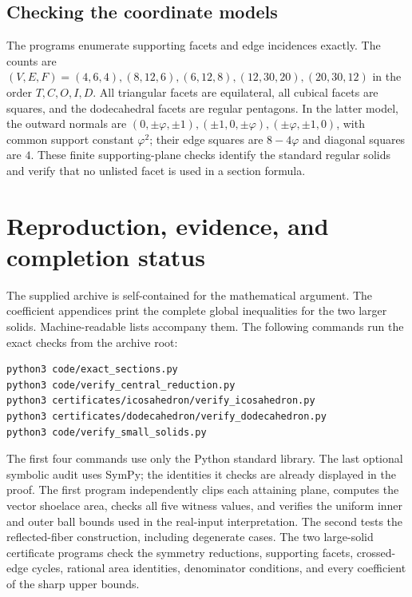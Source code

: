 \documentclass[11pt,letterpaper]{article}
\theoremstyle{definition}\newtheorem{definition}[theorem]{Definition}
\begin{document}
\subsection{Checking the coordinate models}
The programs enumerate supporting facets and edge incidences exactly.
The counts are $(V,E,F)=(4,6,4),(8,12,6),(6,12,8),(12,30,20),
(20,30,12)$ in the order $T,C,O,I,D$. All triangular facets are
equilateral, all cubical facets are squares, and the dodecahedral
facets are regular pentagons. In the latter model, the outward
normals are $(0,\pm\varphi,\pm1),(\pm1,0,\pm\varphi),
(\pm\varphi,\pm1,0)$, with common support constant $\varphi^2$;
their edge squares are $8-4\varphi$ and diagonal squares are $4$.
These finite supporting-plane checks identify the standard regular
solids and verify that no unlisted facet is used in a section formula.









\section{Reproduction, evidence, and completion status}
The supplied archive is self-contained for the mathematical argument.
The coefficient appendices print the complete global inequalities for
the two larger solids. Machine-readable lists accompany them.
The following commands run the exact checks from the archive root:
\begin{lstlisting}
python3 code/exact_sections.py
python3 code/verify_central_reduction.py
python3 certificates/icosahedron/verify_icosahedron.py
python3 certificates/dodecahedron/verify_dodecahedron.py
python3 code/verify_small_solids.py
\end{lstlisting}
The first four commands use only the Python standard library. The
last optional symbolic audit uses SymPy; the identities it checks are
already displayed in the proof. The first program independently clips
each attaining plane, computes the vector shoelace area, checks all
five witness values, and verifies the uniform inner and outer ball
bounds used in the real-input interpretation. The second tests the
reflected-fiber construction, including degenerate cases. The two
large-solid certificate programs check
the symmetry reductions, supporting facets, crossed-edge cycles,
rational area identities, denominator conditions, and every
coefficient of the sharp upper bounds.
\end{document}
